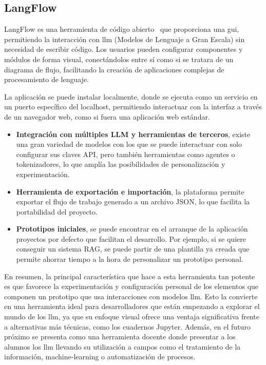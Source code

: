 	\subsection{LangFlow}
	LangFlow es una herramienta de código abierto~\cite{langflow} que proporciona una \acrfull{gui}, permitiendo la interacción con \acrlong{llm} (Modelos de Lenguaje a Gran Escala) sin necesidad de escribir código. Los usuarios pueden configurar componentes y módulos de forma visual, conectándolos entre sí como si se tratara de un diagrama de flujo, facilitando la creación de aplicaciones complejas de procesamiento de lenguaje.
	
	La aplicación se puede instalar localmente, donde se ejecuta como un servicio en un puerto específico del localhost, permitiendo interactuar con la interfaz a través de un navegador web, como si fuera una aplicación web estándar.
	\begin{itemize}
		
		\item \textbf{Integración con múltiples LLM y herramientas de terceros}, existe una gran variedad de modelos con los que se puede interactuar con solo configurar sus claves API, pero también herramientas como agentes o tokenizadores, lo que amplía las posibilidades de personalización y experimentación.
		
		\item \textbf{Herramienta de exportación e importación}, la plataforma permite exportar el flujo de trabajo generado a un archivo JSON, lo que facilita la portabilidad del proyecto.
		
		\item \textbf{Prototipos iniciales}, se puede encontrar en el arranque de la aplicación proyectos por defecto que facilitan el desarrollo. Por ejemplo, si se quiere conseguir un sistema RAG, se puede partir de una plantilla ya creada que permite ahorrar tiempo a la hora de personalizar un prototipo personal.
	
	\end{itemize}
	En resumen, la principal característica que hace a esta herramienta tan potente es que favorece la experimentación y configuración personal de los elementos que componen un prototipo que usa interacciones con modelos \acrshort{llm}. Esto la convierte en una herramienta ideal para desarrolladores que están empezando a explorar el mundo de los \acrshort{llm}, ya que su enfoque visual ofrece una ventaja significativa frente a alternativas más técnicas, como los cuadernos Jupyter. Además, en el futuro próximo se presenta como una herramienta docente donde presentar a los alumnos los \acrlong{llm} llevando su utilización a campos como el tratamiento de la información, machine-learning o automatización de procesos.


